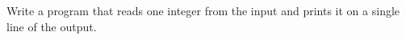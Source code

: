 




Write a program that reads one integer from the input and prints it on a single line of the output.

\koniec

